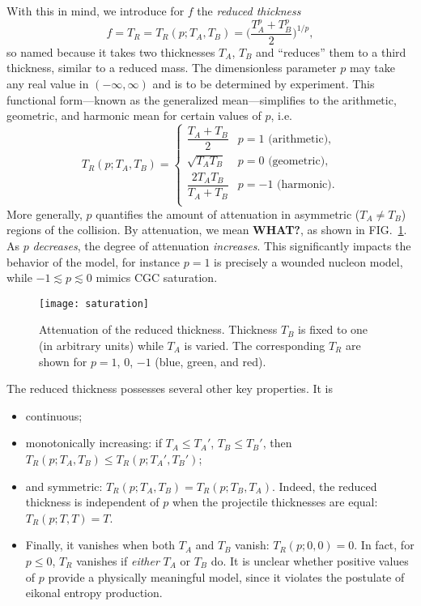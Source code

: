 \documentclass[aps,prl,reprint,amsmath,nofootinbib]{revtex4-1}
\begin{document}
With this in mind, we introduce for $f$ the \emph{reduced thickness}
\begin{equation}
  f = T_R = T_R(p; T_A, T_B) = \biggl( \frac{T_A^p + T_B^p}{2} \biggr)^{1/p},
\end{equation}
so named because it takes two thicknesses $T_A$, $T_B$ and ``reduces'' them to a third thickness, similar to a
reduced mass.  The dimensionless parameter $p$ may take any real value in $(-\infty, \infty)$ and is to be
determined by experiment.  This functional form---known as the generalized mean---simplifies to the arithmetic,
geometric, and harmonic mean for certain values of $p$, i.e.
\begin{equation}
  T_R(p; T_A, T_B) =
  \begin{cases}
    \dfrac{T_A + T_B}{2} & p = 1 \text{ (arithmetic)}, \\[2ex]
    \sqrt{T_A T_B} & p = 0 \text{ (geometric)}, \\[2ex]
    \dfrac{2 T_A T_B}{T_A + T_B} & p = -1 \text{ (harmonic)}. \\
  \end{cases}
\end{equation}
More generally, $p$ quantifies the amount of attenuation in asymmetric ($T_A \neq T_B$) regions of the
collision.  By attenuation, we mean \textbf{WHAT?}, as shown in FIG.~\ref{fig:saturation}.  As $p$
\emph{decreases}, the degree of attenuation \emph{increases}.  This significantly impacts the behavior of the
model, for instance $p=1$ is precisely a wounded nucleon model, while $-1 \lesssim p \lesssim 0$ mimics CGC
saturation.

\begin{figure}[t]
  \texttt{[image: saturation]}
  \caption{
    \label{fig:saturation}
    Attenuation of the reduced thickness.  Thickness $T_B$ is fixed to one (in arbitrary units) while $T_A$ is
    varied.  The corresponding $T_R$ are shown for $p = 1$, 0, $-1$ (blue, green, and red).
  }
\end{figure}

The reduced thickness possesses several other key properties.  It is
\begin{itemize}
  \item continuous;
  \item monotonically increasing:  if
    $T_A \leq T_A'$, $T_B \leq T_B'$, then
    $T_R(p; T_A, T_B) \leq T_R(p; T_A', T_B')$;
  \item and symmetric:
    $T_R(p; T_A, T_B) = T_R(p; T_B, T_A)$.
    Indeed, the reduced thickness is independent of $p$ when the projectile thicknesses are equal:
    $T_R(p; T, T) = T$.
  \item Finally, it vanishes when both $T_A$ and $T_B$ vanish: $T_R(p; 0, 0) = 0$.
    In fact, for $p \leq 0$, $T_R$ vanishes if \emph{either} $T_A$ or $T_B$ do.  It is unclear whether
    positive values of $p$ provide a physically meaningful model, since it violates the postulate of eikonal
    entropy production.
\end{itemize}
\end{document}
